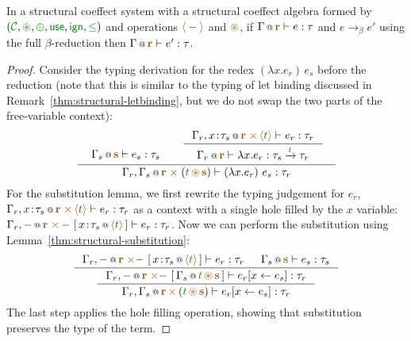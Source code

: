 \begin{theorem}
In a structural coeffect system with a structural coeffect algebra formed by 
$(\C, \cseq, \cpar, \cunit, \czero, \cleq)$ and operations $\alift{-}$ and $\aseq$,
if $\coctx{\Gamma}{\aclrd{\textbf{r}}} \vdash e : \tau$ 
and $e \rightarrow_{\beta} e'$ using the full $\beta$-reduction then
$\coctx{\Gamma}{\aclrd{\textbf{r}}} \vdash e' : \tau$.
\end{theorem}
\begin{proof}
Consider the typing derivation for the redex $(\lambda x.e_r)\,e_s$ before the reduction
(note that this is similar to the typing of let binding discussed in Remark~\ref{thm:structural-letbinding},
but we do not swap the two parts of the free-variable context):
%
\begin{equation*}
\inference
  { \begin{array}{l}\coctx{\Gamma_s}{\aclrd{\textbf{s}}} \vdash e_s : \tau_s\vspace{-2em}\end{array} &
    \inference
      { \coctx{\Gamma_r, x\!:\!\tau_s}{\aclrd{\textbf{r}}\;\atimes\,\alift{\cclrd{t}}} \vdash e_r : \tau_r }
      { \coctx{\Gamma_r}{\aclrd{\textbf{r}}} \vdash \lambda x.e_r : \tau_s \xrightarrow{\cclrd{t}} \tau_r} \vspace{0.2em} }
  { \coctx{\Gamma_r, \Gamma_s}{\aclrd{\textbf{r}} \;\atimes\; (\cclrd{t} \,\aseq\, \aclrd{\textbf{s}})} \vdash (\lambda x.e_r)~e_s : \tau_r }
\end{equation*}
%
For the substitution lemma, we first rewrite the typing judgement for $e_r$, \ie~
$\coctx{\Gamma_r, x\!:\!\tau_s}{\aclrd{\textbf{r}}\;\atimes\,\alift{\cclrd{t}}} \vdash e_r : \tau_r$
as a context with a single hole filled by the $x$ variable:
$\coctx{\Gamma_r, -}{\aclrd{\textbf{r}}\;\atimes\,-}~[\,\coctx{x\!:\!\tau_s}{\alift{\cclrd{t}}}\,] \vdash e_r : \tau_r$.
Now we can perform the substitution using Lemma~\ref{thm:structural-substitution}:
%
\begin{equation*}
\inference
  { \coctx{\Gamma_r, -}{\aclrd{\textbf{r}}\;\atimes-}~[\,\coctx{x\!:\!\tau_s}{\alift{\cclrd{t}}}\,] \vdash e_r : \tau_r & 
    \coctx{\Gamma_s}{\aclrd{\textbf{s}}} \vdash e_s : \tau_s }
  { \inference
      { \coctx{\Gamma_r, -}{\aclrd{\textbf{r}}\;\atimes-}~[\,\coctx{\Gamma_s}{\cclrd{t}\,\aseq\,\aclrd{\textbf{s}} }\,] \vdash \subst{e_r}{x}{e_s} : \tau_r }
      { \coctx{\Gamma_r, \Gamma_s}{\aclrd{\textbf{r}}\,\atimes\,(\cclrd{t}\,\aseq\,\aclrd{\textbf{s}})} \vdash \subst{e_r}{x}{e_s} : \tau_r } }
\end{equation*}
%
The last step applies the hole filling operation, showing that substitution preserves 
the type of the term.
\end{proof}

